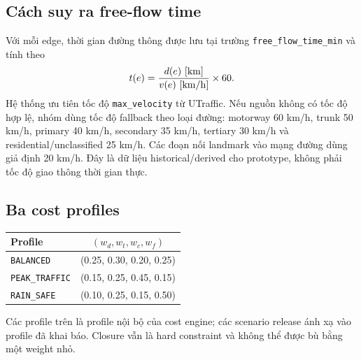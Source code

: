 \subsection{Cách suy ra free-flow time}
Với mỗi edge, thời gian đường thông được lưu tại trường \texttt{free\_flow\_time\_min} và tính theo
\[
t(e)=\frac{d(e)\ [{\rm km}]}{v(e)\ [{\rm km/h}]}\times 60.
\]
Hệ thống ưu tiên tốc độ \texttt{max\_velocity} từ UTraffic. Nếu nguồn không có tốc độ hợp lệ, nhóm dùng tốc độ fallback theo loại đường: motorway 60 km/h, trunk 50 km/h, primary 40 km/h, secondary 35 km/h, tertiary 30 km/h và residential/unclassified 25 km/h. Các đoạn nối landmark vào mạng đường dùng giả định 20 km/h. Đây là dữ liệu historical/derived cho prototype, không phải tốc độ giao thông thời gian thực.

\subsection{Ba cost profiles}
\begin{center}
\begin{tabular}{l c}
\toprule
Profile & \((w_d,w_t,w_c,w_f)\)\\
\midrule
\texttt{BALANCED} & (0.25, 0.30, 0.20, 0.25)\\
\texttt{PEAK\_TRAFFIC} & (0.15, 0.25, 0.45, 0.15)\\
\texttt{RAIN\_SAFE} & (0.10, 0.25, 0.15, 0.50)\\
\bottomrule
\end{tabular}
\end{center}
Các profile trên là profile nội bộ của cost engine; các scenario release ánh xạ vào profile đã khai báo. Closure vẫn là hard constraint và không thể được bù bằng một weight nhỏ.
